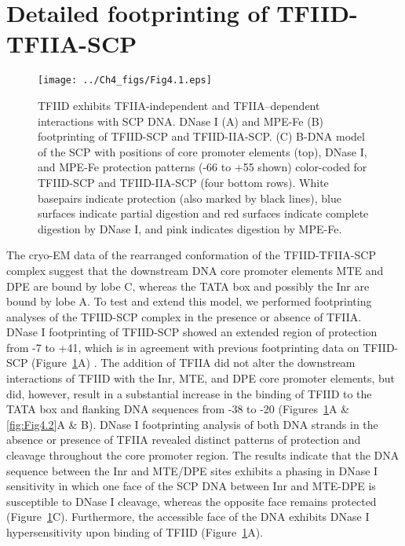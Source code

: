 \section{Detailed footprinting of TFIID-TFIIA-SCP}
\begin{figure}
\centering
\texttt{[image: ../Ch4\_figs/Fig4.1.eps]}
\caption[TFIID exhibits TFIIA-independent and TFIIA–dependent interactions with SCP DNA]{TFIID exhibits TFIIA-independent and TFIIA–dependent interactions with SCP DNA. DNase I (A) and MPE-Fe (B) footprinting of TFIID-SCP and TFIID-IIA-SCP. (C) B-DNA model of the SCP with positions of core promoter elements (top), DNase I, and MPE-Fe protection patterns (-66 to +55 shown) color-coded for TFIID-SCP and TFIID-IIA-SCP (four bottom rows).  White basepairs indicate protection (also marked by black lines), blue surfaces indicate partial digestion and red surfaces indicate complete digestion by DNase I, and pink indicates digestion by MPE-Fe.}
\label{fig:Fig4.1}
\end{figure}
The cryo-EM data of the rearranged conformation of the TFIID-TFIIA-SCP complex suggest that the downstream DNA core promoter elements MTE and DPE are bound by lobe C, whereas the TATA box and possibly the Inr are bound by lobe A. To test and extend this model, we performed footprinting analyses of the TFIID-SCP complex in the presence or absence of TFIIA.\\
\indent DNase I footprinting of TFIID-SCP showed an extended region of protection from -7 to +41, which is in agreement with previous footprinting data on TFIID-SCP (Figure~\ref{fig:Fig4.1}A) \cite{Juven-Gershon_1249}. The addition of TFIIA did not alter the downstream interactions of TFIID with the Inr, MTE, and DPE core promoter elements, but did, however, result in a substantial increase in the binding of TFIID to the TATA box and flanking DNA sequences from -38 to -20 (Figures~\ref{fig:Fig4.1}A \& \ref{fig:Fig4.2}A \& B). DNase I footprinting analysis of both DNA strands in the absence or presence of TFIIA revealed distinct patterns of protection and cleavage throughout the core promoter region. The results indicate that the DNA sequence between the Inr and MTE/DPE sites exhibits a phasing in DNase I sensitivity in which one face of the SCP DNA between Inr and MTE-DPE is susceptible to DNase I cleavage, whereas the opposite face remains protected (Figure~\ref{fig:Fig4.1}C). Furthermore, the accessible face of the DNA exhibits DNase I hypersensitivity upon binding of TFIID (Figure~\ref{fig:Fig4.1}A). \\
